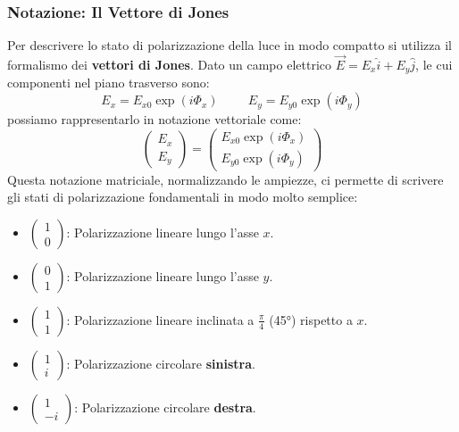 \documentclass[openany,a4paper,12pt]{book}
\begin{document}
\subsubsection{Notazione: Il Vettore di Jones}
Per descrivere lo stato di polarizzazione della luce in modo compatto si utilizza il formalismo dei \textbf{vettori di Jones}. 
Dato un campo elettrico $\vec{E} = E_x \hat{i} + E_y \hat{j}$, le cui componenti nel piano trasverso sono:
\[
E_x = E_{x0} \exp(i\Phi_x) \hspace{1cm} E_y = E_{y0} \exp(i\Phi_y)
\]
possiamo rappresentarlo in notazione vettoriale come:
\[
\begin{pmatrix}
E_x \\
E_y
\end{pmatrix}
=
\begin{pmatrix}
E_{x0}\exp(i\Phi_x) \\
E_{y0}\exp(i\Phi_y)
\end{pmatrix}
\]
Questa notazione matriciale, normalizzando le ampiezze, ci permette di scrivere gli stati di polarizzazione fondamentali in modo molto semplice:
\begin{itemize}
    \item $\begin{pmatrix} 1 \\ 0 \end{pmatrix}$: Polarizzazione lineare lungo l'asse $x$.
    \item $\begin{pmatrix} 0 \\ 1 \end{pmatrix}$: Polarizzazione lineare lungo l'asse $y$.
    \item $\begin{pmatrix} 1 \\ 1 \end{pmatrix}$: Polarizzazione lineare inclinata a $\frac{\pi}{4}$ (45°) rispetto a $x$.
    \item $\begin{pmatrix} 1 \\ i \end{pmatrix}$: Polarizzazione circolare \textbf{sinistra}.
    \item $\begin{pmatrix} 1 \\ -i \end{pmatrix}$: Polarizzazione circolare \textbf{destra}.
\end{itemize}
\end{document}
